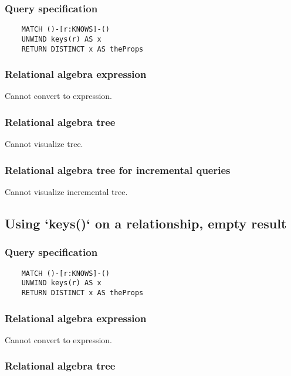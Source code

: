 	\subsubsection*{Query specification}

	\begin{lstlisting}
	MATCH ()-[r:KNOWS]-()
	UNWIND keys(r) AS x
	RETURN DISTINCT x AS theProps
	\end{lstlisting}


	\subsubsection*{Relational algebra expression}

	Cannot convert to expression.

	\subsubsection*{Relational algebra tree}

	Cannot visualize tree.

	\subsubsection*{Relational algebra tree for incremental queries}

	Cannot visualize incremental tree.
	\subsection{Using `keys()` on a relationship, empty result}

	\subsubsection*{Query specification}

	\begin{lstlisting}
	MATCH ()-[r:KNOWS]-()
	UNWIND keys(r) AS x
	RETURN DISTINCT x AS theProps
	\end{lstlisting}


	\subsubsection*{Relational algebra expression}

	Cannot convert to expression.

	\subsubsection*{Relational algebra tree}

